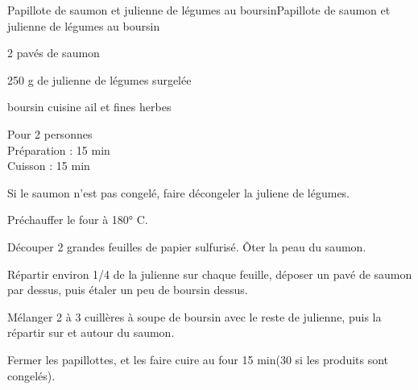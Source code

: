 \begin{recette}{Papillote de saumon et julienne de légumes au boursin}{Papillote de saumon et julienne de légumes au boursin}

\begin{ingredients}
2 pavés de saumon\par
250 g de julienne de légumes surgelée\par
boursin cuisine ail et fines herbes\par
\end{ingredients}

\begin{infos}
Pour 2 personnes\\
Préparation : 15 min\\
Cuisson : 15 min\\
\end{infos}

\begin{etapes}
\item Si le saumon n'est pas congelé, faire décongeler la juliene de légumes.
\item Préchauffer le four à 180° C.
\item Découper 2 grandes feuilles de papier sulfurisé. Ôter la peau du saumon.
\item Répartir environ 1/4 de la julienne sur chaque feuille, déposer un pavé de saumon par dessus, puis étaler un peu de boursin dessus.
\item Mélanger 2 à 3 cuillères à soupe de boursin avec le reste de julienne, puis la répartir sur et autour du saumon.
\item Fermer les papillottes, et les faire cuire au four 15 min(30 si les produits sont congelés).
\end{etapes}

\end{recette}